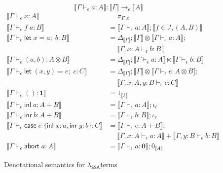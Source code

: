 \documentclass[acmsmall,screen,review]{acmart}
\newcommand{\mc}[1]{\ensuremath{\mathcal{#1}}}
\newcommand{\mb}[1]{\ensuremath{\mathbf{#1}}}
\newcommand{\ms}[1]{\ensuremath{\mathsf{#1}}}
\newcommand{\lto}{:}
\newcommand{\linl}[1]{\ms{inl}\;{#1}}
\newcommand{\linr}[1]{\ms{inr}\;{#1}}
\newcommand{\labort}[1]{\ms{abort}\;{#1}}
\newcommand{\letexpr}[3]{\ensuremath{\ms{let}\;#1 = #2;\;#3}}
\newcommand{\caseexpr}[5]{\ms{case}\;#1\;\{\linl{#2} \lto #3, \linr{#4} \lto #5\}}
\newcommand{\bhyp}[2]{#1 : #2}
\newcommand{\hasty}[4]{#1 \vdash_{#2} #3: {#4}}
\newcommand{\isop}[4]{#1 \in \mc{I}_{#4}(#2, #3)}
\newcommand{\dnt}[1]{\llbracket{#1}\rrbracket}
\newcommand{\isotopessa}{\(\lambda_{\ms{SSA}}\)}
\begin{document}
\begin{figure}[H]
  \begin{equation*}
    \boxed{\dnt{\hasty{\Gamma}{\epsilon}{a}{A}} : \dnt{\Gamma} \to_\epsilon \dnt{A}}
  \end{equation*}
  \begin{align*}
    \dnt{\hasty{\Gamma}{\epsilon}{x}{A}} &= \pi_{\Gamma, x} \\
    \dnt{\hasty{\Gamma}{\epsilon}{f\;a}{B}} 
      &= \dnt{\hasty{\Gamma}{\epsilon}{a}{A}} ; \dnt{\isop{f}{A}{B}{\epsilon}} \\
    \dnt{\hasty{\Gamma}{\epsilon}{\letexpr{x}{a}{b}}{B}}
      &= \Delta_{\dnt{\Gamma}}
      ; \dnt{\Gamma} \otimes \dnt{\hasty{\Gamma}{\epsilon}{a}{A}};
      \\&\quad\; 
      \dnt{\hasty{\Gamma, \bhyp{x}{A}}{\epsilon}{b}{B}}
      \\
    \dnt{\hasty{\Gamma}{\epsilon}{(a, b)}{A \otimes B}} 
      &= \Delta_{\dnt{\Gamma}}
      ; \dnt{\hasty{\Gamma}{\epsilon}{a}{A}} \ltimes \dnt{\hasty{\Gamma}{\epsilon}{b}{B}}
      \\
    \dnt{\hasty{\Gamma}{\epsilon}{\letexpr{(x, y)}{e}{c}}{C}}
      &= \Delta_{\dnt{\Gamma}}
      ; \dnt{\Gamma} \otimes \dnt{\hasty{\Gamma}{\epsilon}{e}{A \otimes B}} ;
      \\&\quad\; 
      \dnt{\hasty{\Gamma, \bhyp{x}{A}, \bhyp{y}{B}}{\epsilon}{c}{C}}
      \\
    \dnt{\hasty{\Gamma}{\epsilon}{()}{\mb{1}}} &= 1_{\dnt{\Gamma}} \\
    \dnt{\hasty{\Gamma}{\epsilon}{\linl{a}}{A + B}}
      &= \dnt{\hasty{\Gamma}{\epsilon}{a}{A}} ; \iota_l \\
    \dnt{\hasty{\Gamma}{\epsilon}{\linr{b}}{A + B}}
      &= \dnt{\hasty{\Gamma}{\epsilon}{b}{B}} ; \iota_r \\
    \dnt{\hasty{\Gamma}{\epsilon}{\caseexpr{e}{x}{a}{y}{b}}{C}}
      &= \dnt{\hasty{\Gamma}{\epsilon}{e}{A + B}}
      ; \\& \quad\; 
      \dnt{\hasty{\Gamma, \bhyp{x}{A}}{\epsilon}{a}{A}}
      + \dnt{\hasty{\Gamma, \bhyp{y}{B}}{\epsilon}{b}{B}}
      \\
    \dnt{\hasty{\Gamma}{\epsilon}{\labort{a}}{A}} 
      &= \dnt{\hasty{\Gamma}{\epsilon}{a}{\mb{0}}} ; 0_{\dnt{A}}
  \end{align*}
  \caption{Denotational semantics for \isotopessa terms}
  \label{fig:ssa-term-sem}
\end{figure}
\end{document}
